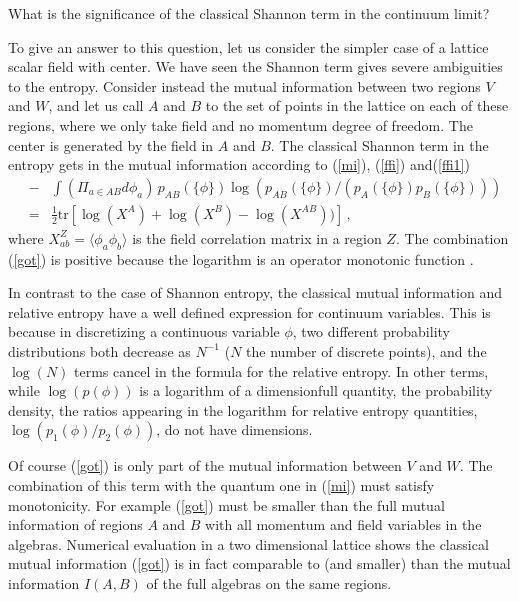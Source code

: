 \documentclass[12pt,a4paper]{article}
\newcommand{\bea}{\begin{eqnarray}}
\newcommand{\eea}{\end{eqnarray}}
\begin{document}
What is the significance of the classical Shannon term in the continuum limit? 

To give an answer to this question, let us consider the simpler case of a lattice scalar field with center. We have seen the
 Shannon term gives severe ambiguities to the entropy. Consider instead the mutual information between two regions $V$ and $W$, and let us call $A$ and $B$ to the set of points 
in the lattice on each of these regions, where we only take field and no momentum degree of freedom. The center is generated by the field in $A$ and $B$. The classical Shannon term 
in the entropy gets in the mutual information according to (\ref{mi}), (\ref{ffi}) and(\ref{ffi1})
\bea
&-&\int (\Pi_{a\in AB} d\phi_a) \, p_{AB}(\{\phi\}) \log(p_{AB}(\{\phi\})/(p_A(\{\phi\})p_B(\{\phi\})))\nonumber\\
&=& \frac{1}{2}\textrm{tr} \left[\log(X^A)+\log(X^B)-\log(X^{AB}))\right]\,,\label{got}
\eea
where $X^Z_{ab}=\langle \phi_a \phi_b\rangle$ is the field correlation matrix in a region $Z$. The combination (\ref{got}) is positive because the 
logarithm is an operator monotonic function \cite{petz}.

In contrast to the case of Shannon entropy, the classical mutual information and relative entropy have a well defined expression 
for continuum variables. This is because in discretizing a continuous variable $\phi$, two different probability distributions 
both decrease as $N^{-1}$  ($N$ the number of discrete points), and the $\log(N)$ terms cancel in the formula for the relative entropy. 
In other terms, while $\log(p(\phi))$ is a logarithm of a dimensionfull quantity, the probability density, the ratios appearing 
in the logarithm for relative entropy quantities, $\log(p_1(\phi)/p_2(\phi))$, do not have dimensions.  

Of course (\ref{got}) is only part of the mutual information between $V$ and $W$. The combination of this term with the quantum 
one in (\ref{mi}) must satisfy monotonicity. For example (\ref{got}) must be smaller than the full mutual information of 
regions $A$ and $B$ with all momentum and field variables in the algebras. Numerical evaluation in a two dimensional lattice 
shows the classical mutual information (\ref{got}) is in fact comparable to (and smaller) than the mutual information $I(A,B)$ 
of the full algebras on the same regions. 
\end{document}
